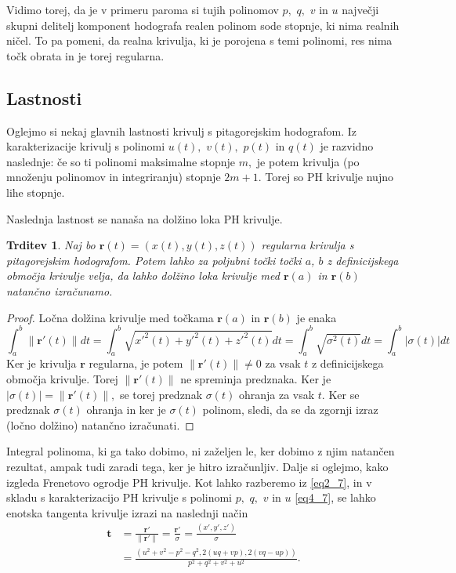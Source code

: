 \documentclass[12pt,a4paper,twoside]{article}
\theoremstyle{definition} %
\theoremstyle{plain} %
\newtheorem{trditev}[definicija]{Trditev}
\numberwithin{equation}{section}  %
\newcommand{\tV}{\mathbf{t}}
\newcommand{\rV}{\mathbf{r}}
\begin{document}
Vidimo torej, da je v primeru paroma si tujih polinomov $p,$ $q,$ $v$ in $u$ največji skupni delitelj komponent hodografa realen polinom sode stopnje, ki nima realnih ničel. To pa pomeni, da realna krivulja, ki je porojena s temi polinomi, res nima točk obrata in je torej regularna.

\subsection{Lastnosti}
\label{subsec_lastnosti}

Oglejmo si nekaj glavnih lastnosti krivulj s pitagorejskim hodografom. Iz karakterizacije krivulj s polinomi $u(t),$ $v(t),$ $p(t)$ in $q(t)$ je razvidno naslednje: če so ti polinomi maksimalne stopnje $m,$ je potem krivulja (po množenju polinomov in integriranju) stopnje $2m+1.$ Torej so PH krivulje nujno lihe stopnje.

Naslednja lastnost se nanaša na dolžino loka PH krivulje.
\begin{trditev}
	Naj bo $\rV(t)=(x(t),y(t),z(t))$ regularna krivulja s pitagorejskim hodografom. Potem lahko za poljubni točki točki $a$, $b$ z definicijskega območja krivulje velja, da lahko dolžino loka krivulje med $\rV(a)$ in $\rV(b)$ natančno izračunamo.
\end{trditev}
\begin{proof}
	Ločna dolžina krivulje med točkama $\rV(a)$ in $\rV(b)$ je enaka
	\begin{equation}
		\int_a^b\lVert \rV'(t) \rVert dt=\int_a^b\sqrt{x'^2(t)+y'^2(t)+z'^2(t)}dt=\int_a^b\sqrt{\sigma^2(t)}dt=\int_a^b|\sigma(t)|dt
	\end{equation}
	Ker je krivulja $\rV$ regularna, je potem $\lVert \rV'(t) \rVert \neq 0$ za vsak $t$ z definicijskega območja krivulje. Torej $\lVert \rV'(t) \rVert$ ne spreminja predznaka. Ker je $|\sigma(t)|=\lVert \rV'(t) \rVert,$ se torej predznak $\sigma(t)$ ohranja za vsak $t.$ Ker se predznak $\sigma(t)$ ohranja in ker je $\sigma(t)$ polinom, sledi, da se da zgornji izraz (ločno dolžino) natančno izračunati.
\end{proof}

Integral polinoma, ki ga tako dobimo, ni zaželjen le, ker dobimo z njim natančen rezultat, ampak tudi zaradi tega, ker je hitro izračunljiv. Dalje si oglejmo, kako izgleda Frenetovo ogrodje PH krivulje. Kot lahko razberemo iz \eqref{eq2_7}, in v skladu s karakterizacijo PH krivulje s polinomi $p,$ $q,$ $v$ in $u$ \eqref{eq4_7}, se lahko enotska tangenta krivulje izrazi na naslednji način
\begin{align}
	\tV&=\frac{\rV'}{\lVert \rV' \rVert}=\frac{\rV'}{\sigma}=\frac{(x',y',z')}{\sigma} \nonumber \\
	&=\frac{(u^2+v^2-p^2-q^2,2(uq+vp),2(vq-up))}{p^2+q^2+v^2+u^2}.
\end{align}
\end{document}
